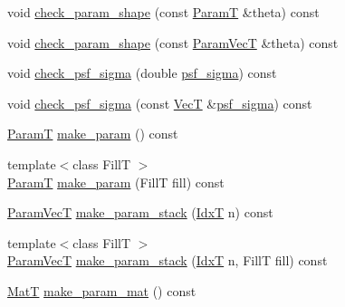 \begin{DoxyCompactItemize}
\item 
void \hyperlink{classmappel_1_1PointEmitterModel_a97a868e842302f670ed9f9bd49416771}{check\+\_\+param\+\_\+shape} (const \hyperlink{classmappel_1_1PointEmitterModel_a665ec6aea3aac139bb69a23c06d4b9a1}{ParamT} \&theta) const 
\item 
void \hyperlink{classmappel_1_1PointEmitterModel_a54b341a9bc0e32e2c8bbfe4ec0d8c9a1}{check\+\_\+param\+\_\+shape} (const \hyperlink{classmappel_1_1PointEmitterModel_add253b568d763f1513a810aac35de719}{Param\+VecT} \&theta) const 
\item 
void \hyperlink{classmappel_1_1PointEmitterModel_a01ce8d6358acbd2575be519dff1df89b}{check\+\_\+psf\+\_\+sigma} (double \hyperlink{classmappel_1_1Gauss1DModel_a62c6b2a5d8ab5f5596504a19daed66b2}{psf\+\_\+sigma}) const 
\item 
void \hyperlink{classmappel_1_1PointEmitterModel_a85780ca544a5ef5e0a62e74005081677}{check\+\_\+psf\+\_\+sigma} (const \hyperlink{namespacemappel_a2225ad69f358daa3f4f99282a35b9a3a}{VecT} \&\hyperlink{classmappel_1_1Gauss1DModel_a62c6b2a5d8ab5f5596504a19daed66b2}{psf\+\_\+sigma}) const 
\item 
\hyperlink{classmappel_1_1PointEmitterModel_a665ec6aea3aac139bb69a23c06d4b9a1}{ParamT} \hyperlink{classmappel_1_1PointEmitterModel_a1cd8ff64ce4132b6eaa8655696885749}{make\+\_\+param} () const 
\item 
{\footnotesize template$<$class FillT $>$ }\\\hyperlink{classmappel_1_1PointEmitterModel_a665ec6aea3aac139bb69a23c06d4b9a1}{ParamT} \hyperlink{classmappel_1_1PointEmitterModel_a5638e3df26cf84d7cf0f23112132682e}{make\+\_\+param} (FillT fill) const 
\item 
\hyperlink{classmappel_1_1PointEmitterModel_add253b568d763f1513a810aac35de719}{Param\+VecT} \hyperlink{classmappel_1_1PointEmitterModel_a6c7edc7f2549058df66472cd7647cf9b}{make\+\_\+param\+\_\+stack} (\hyperlink{namespacemappel_ab17ec0f30b61ece292439d7ece81d3a8}{IdxT} n) const 
\item 
{\footnotesize template$<$class FillT $>$ }\\\hyperlink{classmappel_1_1PointEmitterModel_add253b568d763f1513a810aac35de719}{Param\+VecT} \hyperlink{classmappel_1_1PointEmitterModel_abab975b04e09e6336a930b6d8fd8c267}{make\+\_\+param\+\_\+stack} (\hyperlink{namespacemappel_ab17ec0f30b61ece292439d7ece81d3a8}{IdxT} n, FillT fill) const 
\item 
\hyperlink{namespacemappel_a7091ab87c528041f7e2027195fad8915}{MatT} \hyperlink{classmappel_1_1PointEmitterModel_a8ede9fe8e3b6a3e621c2da72e23c7f9d}{make\+\_\+param\+\_\+mat} () const 

\end{DoxyCompactItemize}
